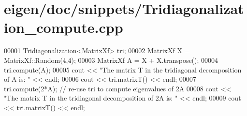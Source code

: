 \hypertarget{eigen_2doc_2snippets_2_tridiagonalization__compute_8cpp_source}{}\section{eigen/doc/snippets/\+Tridiagonalization\+\_\+compute.cpp}
\label{eigen_2doc_2snippets_2_tridiagonalization__compute_8cpp_source}

\begin{DoxyCode}
00001 Tridiagonalization<MatrixXf> tri;
00002 MatrixXf X = MatrixXf::Random(4,4);
00003 MatrixXf A = X + X.transpose();
00004 tri.compute(A);
00005 cout << \textcolor{stringliteral}{"The matrix T in the tridiagonal decomposition of A is: "} << endl;
00006 cout << tri.matrixT() << endl;
00007 tri.compute(2*A); \textcolor{comment}{// re-use tri to compute eigenvalues of 2A}
00008 cout << \textcolor{stringliteral}{"The matrix T in the tridiagonal decomposition of 2A is: "} << endl;
00009 cout << tri.matrixT() << endl;
\end{DoxyCode}
